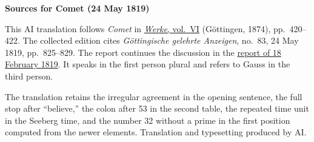 \clearpage\thispagestyle{empty}
\begin{center}\textbf{Sources for Comet (24 May 1819)}\end{center}
\noindent This AI translation follows \textit{Comet} in \href{https://gdz.sub.uni-goettingen.de/id/PPN236007467}{\textit{Werke}, vol.~VI} (Göttingen, 1874), pp.~420--422. The collected edition cites \textit{Göttingische gelehrte Anzeigen}, no.~83, 24 May 1819, pp.~825--829. The report continues the discussion in the \hyperlink{native-422}{report of 18 February 1819}. It speaks in the first person plural and refers to Gauss in the third person.
\par\smallskip\noindent The translation retains the irregular agreement in the opening sentence, the full stop after “believe,” the colon after 53 in the second table, the repeated time unit in the Seeberg time, and the number 32 without a prime in the first position computed from the newer elements. Translation and typesetting produced by AI.
\clearpage
